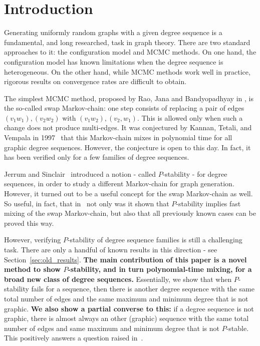 \documentclass[11pt]{elsarticle}
\theoremstyle{plain}
\theoremstyle{definition}
\begin{document}
\section{Introduction}\label{sec:intro}

Generating uniformly random graphs with a given degree sequence is a fundamental, and long researched, task in graph theory. There are two standard approaches to it: the configuration model and MCMC methods. On one hand, the configuration model has known limitations when the degree sequence is heterogeneous. On the other hand, while MCMC methods work well in practice, rigorous results on convergence rates are difficult to obtain.

The simplest MCMC method, proposed by Rao, Jana and Bandyopadhyay in \cite{RJB}, is the so-called swap Markov-chain: one step consists of replacing a pair of edges $(v_1w_1), (v_2w_2)$ with $(v_1 w_2), (v_2,w_1)$. This is allowed only when such a change does not produce multi-edges. It was conjectured by Kannan, Tetali, and Vempala in 1997~\cite{KTV97} that this Markov-chain mixes in polynomial time for all graphic degree sequences. However, the conjecture is open to this day. In fact, it has been verified only for a few families of degree sequences.

Jerrum and Sinclair~\cite{JS90} introduced a notion - called $P$-stability - for degree sequences, in order to study a different Markov-chain for graph generation. However, it turned out to be a useful concept for the swap Markov-chain as well. So useful, in fact, that in~\cite{P-stable} not only was it shown that $P$-stability implies fast mixing of the swap Markov-chain, but also that all previously known cases can be proved this way.

However, verifying $P$-stability of degree sequence families is still a challenging task. There are only a handful of known results in this direction - see Section~\ref{sec:old_results}.
\textbf{The main contribution of this paper is a novel method to show $P$-stability, and in turn polynomial-time mixing, for a broad new class of degree sequences.} Essentially, we show that when $P$-stability fails for a sequence, then there is another degree sequence with the same total number of edges and the same maximum and minimum degree that is not graphic. \textbf{We also show a partial converse to this:} if a degree sequence is not graphic, there is almost always an other (graphic) sequence with the same total number of edges and same maximum and minimum degree that is not $P$-stable. This positively answers a question raised in~\cite{fully}.
\end{document}
